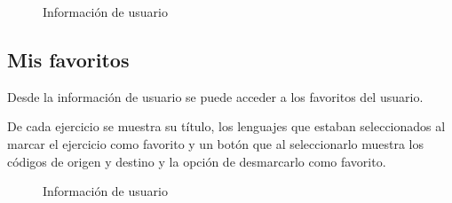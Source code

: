 \begin{itemize}
\begin{figure}[H]
\begin{center}
\caption{Información de usuario\label{fig:usuario}}
\end{center}
\end{figure}

\end{itemize}

\subsection{Mis favoritos}

Desde la información de usuario se puede acceder a los favoritos del usuario.

\vspace{1em}

De cada ejercicio se muestra su título, los lenguajes que estaban seleccionados al marcar el ejercicio como favorito y un botón que al seleccionarlo muestra los códigos de origen y destino y la opción de desmarcarlo como favorito.

\begin{figure}[H]
\begin{center}
\caption{Información de usuario\label{fig:usuario}}
\end{center}
\end{figure}

